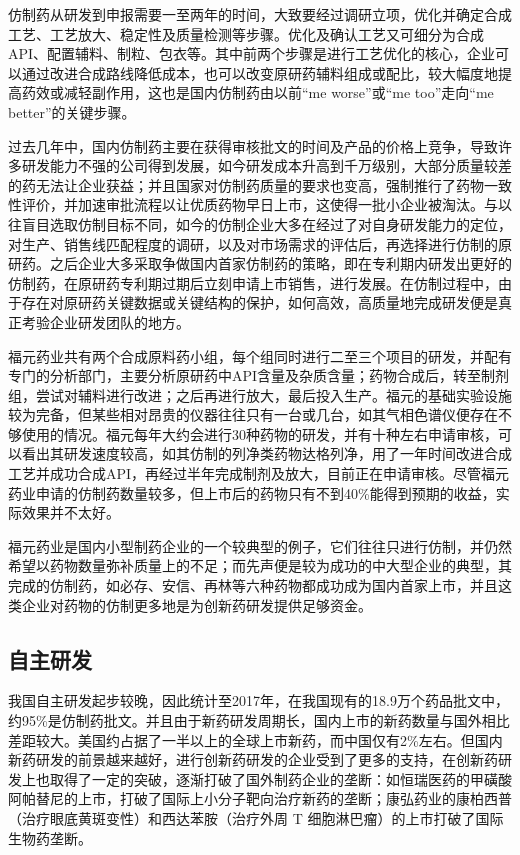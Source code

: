 \documentclass[twocolumn,openany]{ctexbook}
\begin{document}
			仿制药从研发到申报需要一至两年的时间，大致要经过调研立项，优化并确定合成工艺、工艺放大、稳定性及质量检测等步骤\citep{RN22}。优化及确认工艺又可细分为合成API、配置辅料、制粒、包衣等。其中前两个步骤是进行工艺优化的核心，企业可以通过改进合成路线降低成本，也可以改变原研药辅料组成或配比，较大幅度地提高药效或减轻副作用，这也是国内仿制药由以前“me worse”或“me too”走向“me better”的关键步骤\citep{RN12}。
			
			过去几年中，国内仿制药主要在获得审核批文的时间及产品的价格上竞争，导致许多研发能力不强的公司得到发展，如今研发成本升高到千万级别，大部分质量较差的药无法让企业获益；并且国家对仿制药质量的要求也变高，强制推行了药物一致性评价，并加速审批流程以让优质药物早日上市，这使得一批小企业被淘汰。与以往盲目选取仿制目标不同，如今的仿制企业大多在经过了对自身研发能力的定位，对生产、销售线匹配程度的调研，以及对市场需求的评估后，再选择进行仿制的原研药。之后企业大多采取争做国内首家仿制药的策略，即在专利期内研发出更好的仿制药，在原研药专利期过期后立刻申请上市销售，进行发展。在仿制过程中，由于存在对原研药关键数据或关键结构的保护，如何高效，高质量地完成研发便是真正考验企业研发团队的地方。
			
			福元药业共有两个合成原料药小组，每个组同时进行二至三个项目的研发，并配有专门的分析部门，主要分析原研药中API含量及杂质含量；药物合成后，转至制剂组，尝试对辅料进行改进；之后再进行放大，最后投入生产。福元的基础实验设施较为完备，但某些相对昂贵的仪器往往只有一台或几台，如其气相色谱仪便存在不够使用的情况。福元每年大约会进行30种药物的研发，并有十种左右申请审核，可以看出其研发速度较高，如其仿制的列净类药物达格列净，用了一年时间改进合成工艺并成功合成API，再经过半年完成制剂及放大，目前正在申请审核。尽管福元药业申请的仿制药数量较多，但上市后的药物只有不到40\%能得到预期的收益，实际效果并不太好。
			
			福元药业是国内小型制药企业的一个较典型的例子，它们往往只进行仿制，并仍然希望以药物数量弥补质量上的不足；而先声便是较为成功的中大型企业的典型，其完成的仿制药，如必存、安信、再林等六种药物都成功成为国内首家上市，并且这类企业对药物的仿制更多地是为创新药研发提供足够资金。
			
			
			\subsection{自主研发}
			我国自主研发起步较晚，因此统计至2017年，在我国现有的18.9万个药品批文中，约95\%是仿制药批文\citep{RN21}。并且由于新药研发周期长，国内上市的新药数量与国外相比差距较大。美国约占据了一半以上的全球上市新药，而中国仅有2\%左右\citep{RN23}。但国内新药研发的前景越来越好，进行创新药研发的企业受到了更多的支持，在创新药研发上也取得了一定的突破，逐渐打破了国外制药企业的垄断：如恒瑞医药的甲磺酸阿帕替尼的上市，打破了国际上小分子靶向治疗新药的垄断；康弘药业的康柏西普（治疗眼底黄斑变性）和西达苯胺（治疗外周 T 细胞淋巴瘤）的上市打破了国际生物药垄断\citep{RN24}。
			
\end{document}
